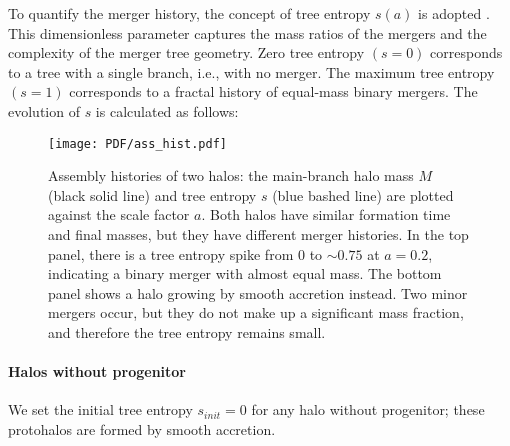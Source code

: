 To quantify the merger history, the concept of tree entropy $s(a)$ is adopted \cite{tree entropy}. This dimensionless parameter captures the mass ratios of the mergers and the complexity of the merger tree geometry. Zero tree entropy $(s=0)$ corresponds to a tree with a single branch, i.e., with no merger. The maximum tree entropy $(s=1)$ corresponds to a fractal history of equal-mass binary mergers. The evolution of $s$ is calculated as follows: 

\begin{figure}[!ht]
	\begin{center}%
	\texttt{[image: PDF/ass\_hist.pdf]}
	\caption{\label{fig:ass_hist}Assembly histories of two halos: the main-branch halo mass $M$ (black solid line) and tree entropy $s$ (blue bashed line) are plotted against the scale factor $a$. Both halos have similar formation time and final masses, but they have different merger histories. In the top panel, there is a tree entropy spike from $0$ to $\sim 0.75$ at $a=0.2$, indicating a binary merger with almost equal mass. The bottom panel shows a halo growing by smooth accretion instead. Two minor mergers occur, but they do not make up a significant mass fraction, and therefore the tree entropy remains small.}
	\end{center}
\end{figure}
\paragraph{Halos without progenitor} 
We set the initial tree entropy $s_{init} = 0$ for any halo without progenitor; these protohalos are formed by smooth accretion.

